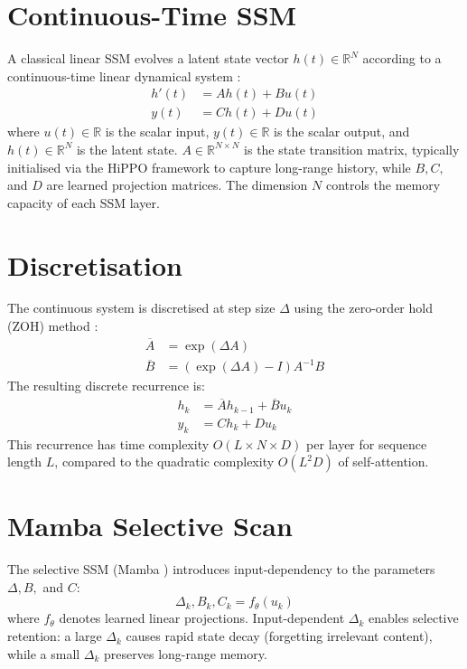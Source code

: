 \documentclass[11pt, a4paper]{report}
\begin{document}
\section{Continuous-Time SSM}
A classical linear SSM evolves a latent state vector $h(t) \in \mathbb{R}^N$ according to a continuous-time linear dynamical system \cite{gu2022efficiently, gu2023mamba}:
\begin{align}
    h'(t) &= A h(t) + B u(t) \\
    y(t) &= C h(t) + D u(t)
\end{align}
where $u(t) \in \mathbb{R}$ is the scalar input, $y(t) \in \mathbb{R}$ is the scalar output, and $h(t) \in \mathbb{R}^N$ is the latent state. $A \in \mathbb{R}^{N \times N}$ is the state transition matrix, typically initialised via the HiPPO framework \cite{gu2022efficiently} to capture long-range history, while $B, C,$ and $D$ are learned projection matrices. The dimension $N$ controls the memory capacity of each SSM layer.

\section{Discretisation}
The continuous system is discretised at step size $\Delta$ using the zero-order hold (ZOH) method \cite{gu2023mamba}:
\begin{align}
    \overline{A} &= \exp(\Delta A) \\
    \overline{B} &= (\exp(\Delta A) - I) A^{-1} B
\end{align}
The resulting discrete recurrence is:
\begin{align}
    h_k &= \overline{A} h_{k-1} + \overline{B} u_k \\
    y_k &= C h_k + D u_k
\end{align}
This recurrence has time complexity $O(L \times N \times D)$ per layer for sequence length $L$, compared to the quadratic complexity $O(L^2 D)$ of self-attention.

\section{Mamba Selective Scan}
The selective SSM (Mamba \cite{gu2023mamba}) introduces input-dependency to the parameters $\Delta, B,$ and $C$:
\begin{equation}
    \Delta_k, B_k, C_k = f_\theta(u_k)
\end{equation}
where $f_\theta$ denotes learned linear projections. Input-dependent $\Delta_k$ enables selective retention: a large $\Delta_k$ causes rapid state decay (forgetting irrelevant content), while a small $\Delta_k$ preserves long-range memory.
\end{document}
